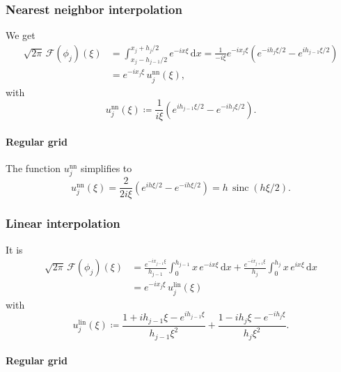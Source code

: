 \documentclass[a4paper]{paper}
\newcommand*{\OP}[1]{{\ensuremath{\mathcal{#1}}}}
\newcommand*{\FT}{\OP{F}}
\DeclareMathOperator{\SINC}{{sinc}}
\DeclareMathOperator{\DEFEQ}{{\coloneqq}}
\newcommand*{\I}{\ensuremath{\mathit{i}}}
\newcommand*{\D}{{\ensuremath{\mathrm{d}}}}
\begin{document}

\subsubsection{Nearest neighbor interpolation}
\label{subsubsec:specif:fourier:nn}

We get
%
\begin{align*}
 \sqrt{2\pi}\, \FT(\phi_j)(\xi)
 &= \int_{x_j - h_{j-1}/2}^{x_j + h_j/2} e^{-\I x\xi}\, \D x
 = \frac{1}{-\I\xi} e^{-\I x_j \xi} (e^{-\I h_j\xi/2} - e^{\I h_{j-1}\xi/2}) \\
 &= e^{-\I x_j \xi}\, u_j^{\mathrm{nn}}(\xi),
\end{align*}
%
with
%
\begin{equation*}
 u_j^{\mathrm{nn}}(\xi) \DEFEQ \frac{1}{\I\xi} (e^{\I h_{j-1}\xi/2} - e^{-\I h_j\xi/2}).
\end{equation*}

\paragraph{Regular grid} 

The function $u_j^{\mathrm{nn}}$ simplifies to
%
\begin{equation*}
 u_j^{\mathrm{nn}}(\xi) = \frac{2}{2\I\xi}(e^{\I h\xi/2} - e^{-\I h\xi/2}) = h\, \SINC(h\xi/2).
\end{equation*}


\subsubsection{Linear interpolation}
\label{subsubsec:specif:fourier:linear}

It is
%
\begin{align*}
 \sqrt{2\pi}\, \FT(\phi_j)(\xi)
 &= \frac{e^{-\I x_{j-1} \xi}}{h_{j-1}} \int_0^{h_{j-1}} x\, e^{-\I x\xi}\, \D x +
 \frac{e^{-\I x_{j+1} \xi}}{h_j} \int_0^{h_j} x\, e^{\I x\xi}\, \D x \\
 &= e^{-\I x_j \xi}\, u_j^{\mathrm{lin}}(\xi)
\end{align*}
%
with
%
\begin{equation*}
 u_j^{\mathrm{lin}}(\xi) \DEFEQ \frac{1 + \I h_{j-1}\xi - e^{\I h_{j-1}\xi}}{h_{j-1} \xi^2} +
 \frac{1 - \I h_j\xi - e^{-\I h_j\xi}}{h_j \xi^2}.
\end{equation*}

\paragraph{Regular grid} 
\end{document}
